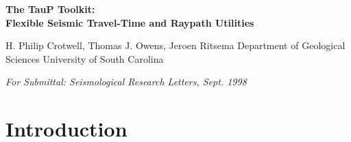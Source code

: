 %
%

%
%
%
 
\setlength{\parindent}{0in}
\setlength{\parskip}{.1in}
\setlength{\oddsidemargin}{0in}
\setlength{\evensidemargin}{0in}
\addtolength{\textwidth}{1.5in}
\addtolength{\textheight}{1in}



%
%

\pagestyle{myheadings}
%
%

%
%

\begin{center}

\LARGE
\textbf{
The TauP Toolkit: \\
Flexible Seismic Travel-Time and Raypath Utilities 
}


H. Philip Crotwell, Thomas J. Owens, Jeroen Ritsema
Department of Geological Sciences
University of South Carolina

\textit{For Submittal: Seismological Research Letters, Sept. 1998}

\end{center}

\renewcommand{\baselinestretch}{2}

\normalsize

\section*{Introduction}

